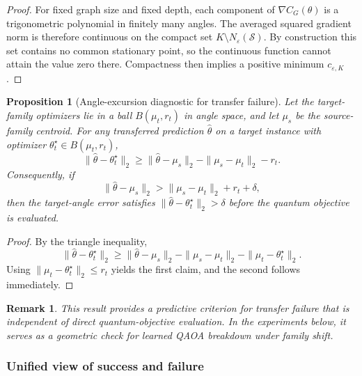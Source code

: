 \documentclass[
  reprint,
  twocolumn,
  aps,
  superscriptaddress,
  longbibliography,
  floatfix
]{revtex4-2}
\newtheorem{proposition}{Proposition}
\newtheorem{remark}{Remark}
\begin{document}
\begin{proof}
For fixed graph size and fixed depth, each component of $\nabla C_G(\theta)$ is a trigonometric polynomial in finitely many angles. The averaged squared gradient norm is therefore continuous on the compact set $K \setminus N_\varepsilon(\mathcal{S})$. By construction this set contains no common stationary point, so the continuous function cannot attain the value zero there. Compactness then implies a positive minimum $c_{\varepsilon,K}$.
\end{proof}

\begin{proposition}[Angle-excursion diagnostic for transfer failure]
Let the target-family optimizers lie in a ball $B(\mu_t,r_t)$ in angle space, and let $\mu_s$ be the source-family centroid. For any transferred prediction $\hat\theta$ on a target instance with optimizer $\theta_t^\star \in B(\mu_t,r_t)$,
\begin{equation}
\|\hat\theta - \theta_t^\star\|_2 \geq \|\hat\theta - \mu_s\|_2 - \|\mu_s - \mu_t\|_2 - r_t.
\end{equation}
Consequently, if
\begin{equation}
\|\hat\theta - \mu_s\|_2 > \|\mu_s - \mu_t\|_2 + r_t + \delta,
\end{equation}
then the target-angle error satisfies $\|\hat\theta - \theta_t^\star\|_2 > \delta$ before the quantum objective is evaluated.
\end{proposition}

\begin{proof}
By the triangle inequality,
\begin{equation}
\|\hat\theta - \theta_t^\star\|_2 \geq \|\hat\theta - \mu_s\|_2 - \|\mu_s - \mu_t\|_2 - \|\mu_t - \theta_t^\star\|_2.
\end{equation}
Using $\|\mu_t - \theta_t^\star\|_2 \leq r_t$ yields the first claim, and the second follows immediately.
\end{proof}

\begin{remark}
This result provides a predictive criterion for transfer failure that is independent of direct quantum-objective evaluation. In the experiments below, it serves as a geometric check for learned QAOA breakdown under family shift.
\end{remark}

\subsubsection{Unified view of success and failure}
\end{document}
